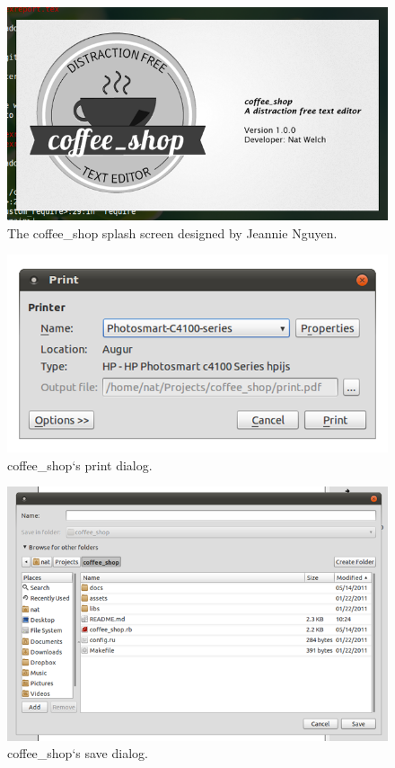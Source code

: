 \documentclass[10pt]{article}
\begin{document}
\begin{figure}
   \centering
      \includegraphics[width=130mm]{images/coffee_shop4.png}
   \caption{The coffee\_shop splash screen designed by Jeannie Nguyen\protect\cite{jeannie}.}
\end{figure}

\begin{figure}
   \centering
      \includegraphics[width=130mm]{images/coffee_shop5.png}
   \caption{coffee\_shop`s print dialog.}
\end{figure}

\begin{figure}
   \centering
      \includegraphics[width=130mm]{images/coffee_shop6.png}
   \caption{coffee\_shop`s save dialog.}
\end{figure}
\end{document}
